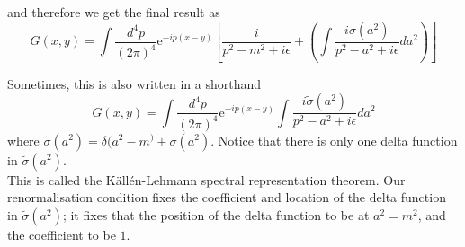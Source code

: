 \documentclass[11pt, notitlepage]{report}
\newcommand{\e}{\mathrm{e}}
\numberwithin{equation}{section}
\begin{document}
and therefore we get the final result as 
\begin{equation*}
    G(x,y) = \int \frac{d^4 p}{(2\pi)^4} \e^{-ip(x-y)} \left[ \frac{i}{p^2 - m^2 + i\epsilon}  +  \left(\int \frac{i\sigma(a^2)}{p^2 - a^2 + i\epsilon} da^2 \right) \right]
\end{equation*}

Sometimes, this is also written in a shorthand 
\begin{equation*}
    G(x,y) = \int \frac{d^4 p}{(2\pi)^4} \e^{-ip(x-y)}\int \frac{i\tilde\sigma(a^2)}{p^2 - a^2 + i\epsilon} da^2 
\end{equation*}
where \(\tilde \sigma(a^2) = \delta(a^2 - m^) + \sigma(a^2)\). Notice that there is only one delta function in \(\tilde\sigma(a^2)\).\\

This is called the K\"all\'en-Lehmann spectral representation theorem. Our renormalisation condition fixes the coefficient and location of the delta function in \(\tilde \sigma(a^2)\); it fixes that the position of the delta function to be at \(a^2 = m^2\), and the coefficient to be \(1\). \\
\end{document}
